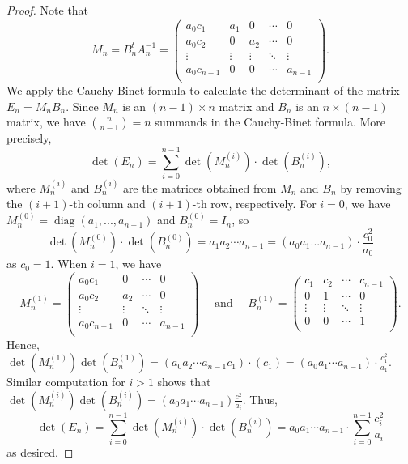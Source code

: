 \documentclass[12pt,reqno]{amsart}
\theoremstyle{definition}
\begin{document}
\begin{proof}
Note that
$$
M_n=B_n^t A_n^{-1} = \begin{pmatrix}
a_0 c_1 & a_1 & 0 & \cdots  & 0 \\ 
a_0 c_2 & 0 & a_2 & \cdots  & 0 \\ 
\vdots & \vdots & \vdots &\ddots & \vdots \\  
a_0 c_{n-1} & 0 & 0 & \cdots  & a_{n-1} \\ 
\end{pmatrix}.
$$
We apply the Cauchy-Binet formula to calculate the determinant of the matrix $E_n = M_n B_n$. Since $M_{n}$ is an $(n-1)\times n$ matrix and $B_n$ is an $n\times (n-1)$ matrix, we have $\binom{n}{n-1}=n$ summands in the Cauchy-Binet formula. More precisely,
$$
\det(E_n) = \sum_{i=0}^{n-1} \det(M^{(i)}_{n}) \cdot \det(B^{(i)}_{n}),
$$
where $M^{(i)}_{n}$ and $B^{(i)}_{n}$ are the matrices obtained from $M_n$ and $B_n$ by removing the $(i+1)$-th column and $(i+1)$-th row, respectively. For $i=0$, we have $M^{(0)}_{n}=\operatorname{diag}(a_1, ..., a_{n-1})$ and $B^{(0)}_{n} = I_n$, so
$$
\det(M^{(0)}_{n}) \cdot \det(B^{(0)}_{n}) = a_1a_2\cdots a_{n-1} = (a_0 a_1 ... a_{n-1}) \cdot \frac{c_0^2}{a_0} 
$$
as $c_0=1$. When $i=1$, we have
$$
M^{(1)}_{n} =  
\begin{pmatrix}
a_0c_1 & 0 & \cdots  & 0 \\ 
a_0c_2 & a_2 & \cdots  & 0 \\ 
\vdots & \vdots &\ddots & \vdots \\  
a_0c_{n-1} & 0 & \cdots  & a_{n-1} \\ 
\end{pmatrix} \quad \text{ and } \quad 
B^{(1)}_{n} = 
\begin{pmatrix}
c_1 & c_2 & \cdots  & c_{n-1} \\ 
0 & 1 & \cdots  & 0 \\ 
\vdots & \vdots &\ddots & \vdots \\  
0 & 0 & \cdots  & 1 \\ 
\end{pmatrix}.
$$
Hence, $\det(M^{(1)}_n)\det(B^{(1)}_n) = (a_0 a_2\cdots a_{n-1} c_1)\cdot (c_1) = (a_0 a_1\cdots a_{n-1})\cdot \frac{c_1^2}{a_1}$. Similar computation for $i>1$ shows that $\det(M^{(i)}_n) \det(B^{(i)}_n) = (a_0a_1\cdots a_{n-1})\frac{c^2}{a_i}$. Thus, 
$$
\det(E_n) = \sum_{i=0}^{n-1} \det(M^{(i)}_{n}) \cdot \det(B^{(i)}_{n}) = a_0a_1\cdots a_{n-1} \cdot \sum_{i=0}^{n-1} \frac{c_i^2}{a_i}
$$
as desired. \end{proof}
\end{document}
